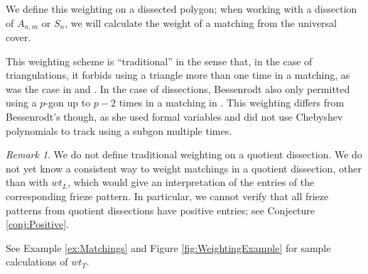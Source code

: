 \documentclass[12pt]{article}
\theoremstyle{remark}
\newtheorem{remark}{Remark}
\begin{document}
We define this weighting on a dissected polygon; when working with a dissection of $A_{n,m}$ or $S_n$, we will calculate the weight of a matching from the universal cover. 

This weighting scheme is ``traditional'' in the sense that, in the case of triangulations, it forbids using a triangle more than one time in a matching, as was the case in \cite{5} and \cite{1}. In the case of dissections, Bessenrodt also only permitted using a $p$-gon up to $p-2$ times in a matching in \cite{4}. This weighting differs from Bessenrodt's though, as she used formal variables and did not use Chebyshev polynomials to track using a subgon multiple times. 

\begin{remark}
We do not define traditional weighting on a quotient dissection. We do not yet know a consistent way to weight matchings in a quotient dissection, other than with $wt_L$, which would give an interpretation of the entries of the corresponding frieze pattern. In particular, we cannot verify that all frieze patterns from quotient dissections have positive entries; see Conjecture \ref{conj:Positive}.
\end{remark}

See Example \ref{ex:Matchings} and Figure \ref{fig:WeightingExample} for sample calculations of $wt_T$. 
\end{document}
